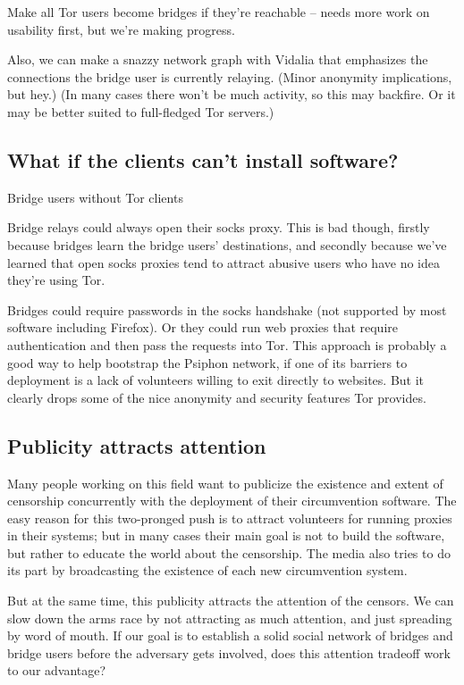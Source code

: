 \documentclass{llncs}
\begin{document}
Make all Tor users become bridges if they're reachable -- needs more work
on usability first, but we're making progress.

Also, we can make a snazzy network graph with Vidalia that emphasizes
the connections the bridge user is currently relaying. (Minor anonymity
implications, but hey.) (In many cases there won't be much activity,
so this may backfire. Or it may be better suited to full-fledged Tor
servers.)

\subsection{What if the clients can't install software?}

Bridge users without Tor clients

Bridge relays could always open their socks proxy. This is bad though,
firstly
because bridges learn the bridge users' destinations, and secondly because
we've learned that open socks proxies tend to attract abusive users who
have no idea they're using Tor.

Bridges could require passwords in the socks handshake (not supported
by most software including Firefox). Or they could run web proxies
that require authentication and then pass the requests into Tor. This
approach is probably a good way to help bootstrap the Psiphon network,
if one of its barriers to deployment is a lack of volunteers willing
to exit directly to websites. But it clearly drops some of the nice
anonymity and security features Tor provides.

\subsection{Publicity attracts attention}
\label{subsec:publicity}

Many people working on this field want to publicize the existence
and extent of censorship concurrently with the deployment of their
circumvention software. The easy reason for this two-pronged push is
to attract volunteers for running proxies in their systems; but in many
cases their main goal is not to build the software, but rather to educate
the world about the censorship. The media also tries to do its part by
broadcasting the existence of each new circumvention system.

But at the same time, this publicity attracts the attention of the
censors. We can slow down the arms race by not attracting as much
attention, and just spreading by word of mouth. If our goal is to
establish a solid social network of bridges and bridge users before
the adversary gets involved, does this attention tradeoff work to our
advantage?
\end{document}

